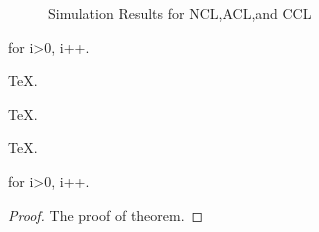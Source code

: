 \begin{figure}[H]
	\centering
	\hspace{0cm}
	\caption{Simulation Results for NCL,ACL,and CCL}
	\label{figb} %
\end{figure}


\begin{Theorem} 
	for i>0, i++.
\end{Theorem}

\begin{Lemma} 
	\TeX .
\end{Lemma}

\begin{Lemma} 
	\TeX .
\end{Lemma}

\begin{Lemma} 
	\TeX .
\end{Lemma}

\begin{Theorem} 
	for i>0, i++.
\end{Theorem}

\begin{proof}
	The proof of theorem.
\end{proof}




